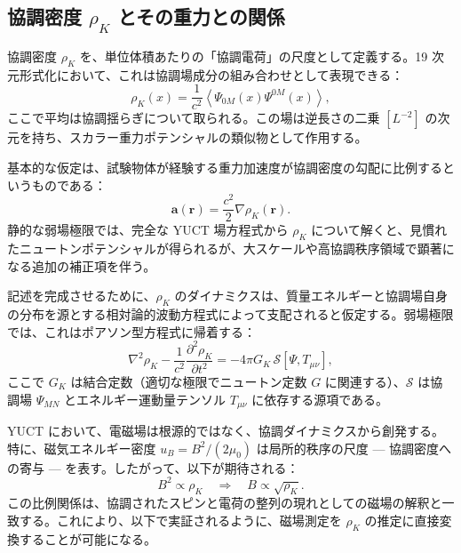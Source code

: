 \documentclass[11pt,a4paper]{article}
\theoremstyle{remark}
\begin{document}
	\subsection{協調密度 $\rho_K$ とその重力との関係}
	\label{subsec:rho_K_definition}
	
	協調密度 $\rho_K$ を、単位体積あたりの「協調電荷」の尺度として定義する。19 次元形式化において、これは協調場成分の組み合わせとして表現できる：
	\begin{equation}
		\rho_K(x) = \frac{1}{c^2} \left\langle \Psi_{0M}(x) \Psi^{0M}(x) \right\rangle,
		\label{eq:coord:rho_K_def}
	\end{equation}
	ここで平均は協調揺らぎについて取られる。この場は逆長さの二乗 $[L^{-2}]$ の次元を持ち、スカラー重力ポテンシャルの類似物として作用する。
	
	基本的な仮定は、試験物体が経験する重力加速度が協調密度の勾配に比例するというものである：
	\begin{equation}
		\mathbf{a}(\mathbf{r}) = \frac{c^2}{2} \nabla \rho_K(\mathbf{r}).
		\label{eq:coord:grav_from_rho}
	\end{equation}
	静的な弱場極限では、完全な YUCT 場方程式から $\rho_K$ について解くと、見慣れたニュートンポテンシャルが得られるが、大スケールや高協調秩序領域で顕著になる追加の補正項を伴う。
	
	記述を完成させるために、$\rho_K$ のダイナミクスは、質量エネルギーと協調場自身の分布を源とする相対論的波動方程式によって支配されると仮定する。弱場極限では、これはポアソン型方程式に帰着する：
	\begin{equation}
		\nabla^2 \rho_K - \frac{1}{c^2}\frac{\partial^2 \rho_K}{\partial t^2} = -4\pi G_K \, \mathcal{S}[\Psi, T_{\mu\nu}],
		\label{eq:coord:rho_K_eqn}
	\end{equation}
	ここで $G_K$ は結合定数（適切な極限でニュートン定数 $G$ に関連する）、$\mathcal{S}$ は協調場 $\Psi_{MN}$ とエネルギー運動量テンソル $T_{\mu\nu}$ に依存する源項である。
	
	YUCT において、電磁場は根源的ではなく、協調ダイナミクスから創発する。特に、磁気エネルギー密度 $u_B = B^2/(2\mu_0)$ は局所的秩序の尺度 — 協調密度への寄与 — を表す。したがって、以下が期待される：
	\begin{equation}
		B^2 \propto \rho_K \quad \Longrightarrow \quad B \propto \sqrt{\rho_K}.
		\label{eq:coord:B_rho}
	\end{equation}
	この比例関係は、協調されたスピンと電荷の整列の現れとしての磁場の解釈と一致する。これにより、以下で実証されるように、磁場測定を $\rho_K$ の推定に直接変換することが可能になる。
	
\end{document}
